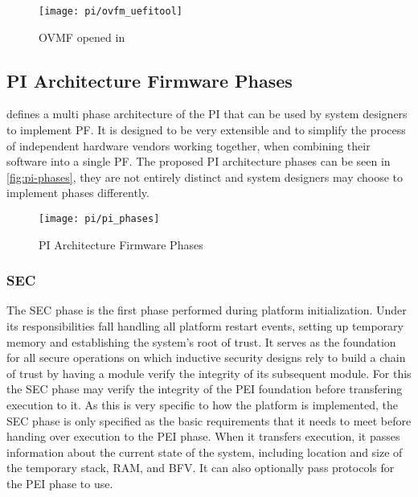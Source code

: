 \begin{figure}[htb]%
    \centering%
    \texttt{[image: pi/ovfm\_uefitool]}%
    \caption{\ac{OVMF} opened in }%
    \label{fig:ovmf-in-uefitool}%
\end{figure}


\subsection{\acs{PI} Architecture Firmware Phases}

\cite{pi-spec} defines a multi phase architecture of the \ac{PI} that can be used by system designers to implement \ac{PF}.
It is designed to be very extensible and to simplify the process of independent hardware vendors working together, when combining their software into a single \ac{PF}.
The proposed \ac{PI} architecture phases can be seen in \autoref{fig:pi-phases}, they are not entirely distinct and system designers may choose to implement phases differently.

\begin{figure}[htb]%
    \centering%
    \texttt{[image: pi/pi\_phases]}%
    \caption{\ac{PI} Architecture Firmware Phases \cite[Figure 2-1]{pi-spec}}%
    \label{fig:pi-phases}%
\end{figure}


\subsubsection{\acf{SEC}}

The \ac{SEC} phase is the first phase performed during platform initialization.
Under its responsibilities fall handling all platform restart events, setting up temporary memory and establishing the system's root of trust.
It serves as the foundation for all secure operations on which inductive security designs rely to build a chain of trust by having a module verify the integrity of its subsequent module.
For this the \ac{SEC} phase may verify the integrity of the \ac{PEI} foundation before transfering execution to it.
As this is very specific to how the platform is implemented, the \ac{SEC} phase is only specified as the basic requirements that it needs to meet before handing over execution to the \ac{PEI} phase.
When it transfers execution, it passes information about the current state of the system, including location and size of the temporary stack, \ac{RAM}, and \ac{BFV}.
It can also optionally pass protocols for the \ac{PEI} phase to use.

